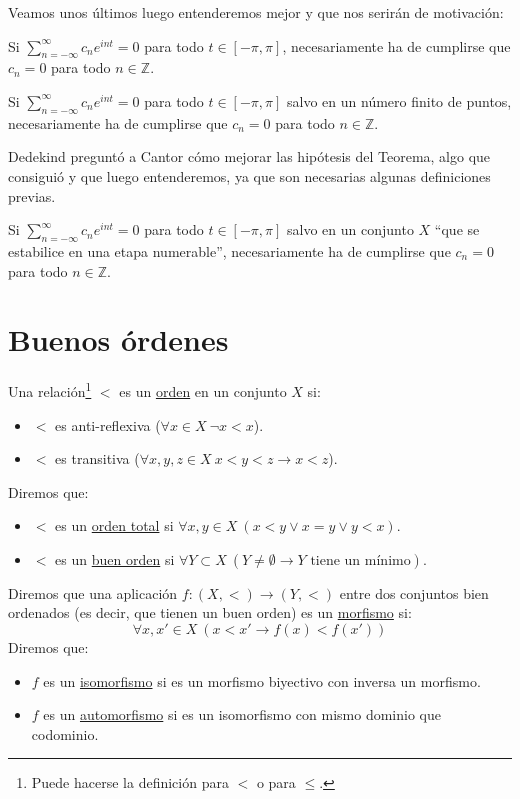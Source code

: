 Veamos unos últimos luego entenderemos mejor y que nos serirán de motivación:
\begin{teo}
    Si $\sum\limits_{n=-\infty}^{\infty}c_n e^{int} = 0$ para todo $t\in [-\pi, \pi]$, necesariamente ha de cumplirse que $c_n = 0$ para todo $n\in \mathbb{Z}$.
\end{teo}

\begin{teo}[Dedekind]
    Si $\sum\limits_{n=-\infty}^{\infty}c_n e^{int} = 0$ para todo $t\in [-\pi, \pi]$ salvo en un número finito de puntos, necesariamente ha de cumplirse que $c_n = 0$ para todo $n\in \mathbb{Z}$.
\end{teo}

Dedekind preguntó a Cantor cómo mejorar las hipótesis del Teorema, algo que consiguió y que luego entenderemos, ya que son necesarias algunas definiciones previas.

\begin{teo}
    Si $\sum\limits_{n=-\infty}^{\infty}c_n e^{int} = 0$ para todo $t\in [-\pi, \pi]$ salvo en un conjunto $X$ ``que se estabilice en una etapa numerable'', necesariamente ha de cumplirse que $c_n = 0$ para todo $n\in \mathbb{Z}$.
\end{teo}

\section{Buenos órdenes}
\begin{definicion}
    Una relación\footnote{Puede hacerse la definición para $<$ o para $\leq$.} $<$ es un \underline{orden} en un conjunto $X$ si:
    \begin{itemize}
        \item $<$ es anti-reflexiva ($\forall x\in X\ \lnot x<x$).
        \item $<$ es transitiva ($\forall x,y,z\in X\ x<y<z \rightarrow x<z$).
    \end{itemize}
    Diremos que:
    \begin{itemize}
        \item $<$ es un \underline{orden total} si $\forall x,y\in X\ (x < y \lor x = y \lor y < x)$.
        \item $<$ es un \underline{buen orden} si $\forall Y\subset X\ (Y\neq \emptyset  \rightarrow Y \text{\ tiene un mínimo})$.
    \end{itemize}
    Diremos que una aplicación $f:(X,<)\to (Y,<)$ entre dos conjuntos bien ordenados (es decir, que tienen un buen orden) es un \underline{morfismo} si:
    \begin{equation*}
        \forall x,x'\in X\ (x<x'\rightarrow f(x)<f(x'))
    \end{equation*}
    Diremos que:
    \begin{itemize}
        \item $f$ es un \underline{isomorfismo} si es un morfismo biyectivo con inversa un morfismo.
        \item $f$ es un \underline{automorfismo} si es un isomorfismo con mismo dominio que codominio.
    \end{itemize}
\end{definicion}

